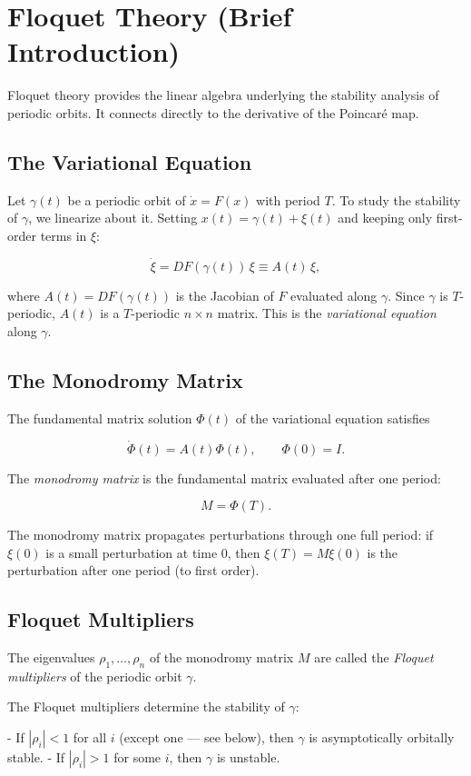 \section{Floquet Theory (Brief Introduction)}\label{sec:4.7}

Floquet theory provides the linear algebra underlying the stability analysis of periodic orbits. It connects directly to the derivative of the Poincaré map.

\subsection{The Variational Equation}\label{sec:4.7.1}

Let $\gamma(t)$ be a periodic orbit of $\dot{x} = F(x)$ with period $T$. To study the stability of $\gamma$, we linearize about it. Setting $x(t) = \gamma(t) + \xi(t)$ and keeping only first-order terms in $\xi$:

\[
\dot{\xi} = DF(\gamma(t)) \, \xi \equiv A(t) \, \xi,
\]

where $A(t) = DF(\gamma(t))$ is the Jacobian of $F$ evaluated along $\gamma$. Since $\gamma$ is $T$-periodic, $A(t)$ is a $T$-periodic $n \times n$ matrix. This is the \textit{variational equation} along $\gamma$.

\subsection{The Monodromy Matrix}\label{sec:4.7.2}

The fundamental matrix solution $\Phi(t)$ of the variational equation satisfies

\[
\dot{\Phi}(t) = A(t)\Phi(t), \qquad \Phi(0) = I.
\]

The \textit{monodromy matrix} is the fundamental matrix evaluated after one period:

\[
M = \Phi(T).
\]

The monodromy matrix propagates perturbations through one full period: if $\xi(0)$ is a small perturbation at time $0$, then $\xi(T) = M\xi(0)$ is the perturbation after one period (to first order).

\subsection{Floquet Multipliers}\label{sec:4.7.3}

\begin{definition}\label{def:4.10.}
The eigenvalues $\rho_1, \ldots, \rho_n$ of the monodromy matrix $M$ are called the \textit{Floquet multipliers} of the periodic orbit $\gamma$.

The Floquet multipliers determine the stability of $\gamma$:

- If $|\rho_i| < 1$ for all $i$ (except one --- see below), then $\gamma$ is asymptotically orbitally stable.
- If $|\rho_i| > 1$ for some $i$, then $\gamma$ is unstable.
\end{definition}


